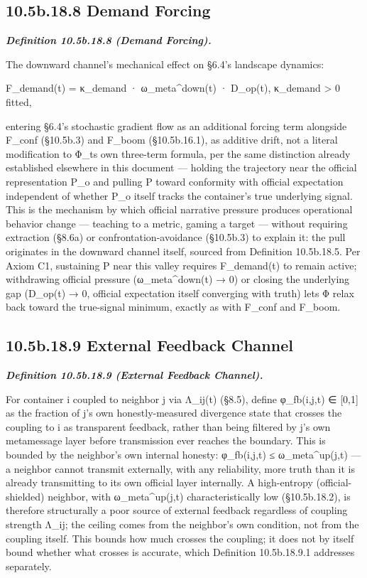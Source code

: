 \documentclass[
]{article}
\begin{document}
\hypertarget{b.18.8-demand-forcing}{%
\subsection{10.5b.18.8 Demand Forcing}\label{b.18.8-demand-forcing}}

\emph{\textbf{Definition 10.5b.18.8 (Demand Forcing).}}

The downward channel's mechanical effect on §6.4's landscape dynamics:

F\_demand(t) = κ\_demand · ω\_meta\^{}down(t) · D\_op(t), κ\_demand
\textgreater{} 0 fitted,

entering §6.4's stochastic gradient flow as an additional forcing term
alongside F\_conf (§10.5b.3) and F\_boom (§10.5b.16.1), as additive
drift, not a literal modification to Φ\_t\textquotesingle s own
three-term formula, per the same distinction already established
elsewhere in this document --- holding the trajectory near the official
representation P\_o and pulling P toward conformity with official
expectation independent of whether P\_o itself tracks the container's
true underlying signal. This is the mechanism by which official
narrative pressure produces operational behavior change --- teaching to
a metric, gaming a target --- without requiring extraction (§8.6a) or
confrontation-avoidance (§10.5b.3) to explain it: the pull originates in
the downward channel itself, sourced from Definition 10.5b.18.5. Per
Axiom C1, sustaining P near this valley requires F\_demand(t) to remain
active; withdrawing official pressure (ω\_meta\^{}down(t) → 0) or
closing the underlying gap (D\_op(t) → 0, official expectation itself
converging with truth) lets Φ relax back toward the true-signal minimum,
exactly as with F\_conf and F\_boom.

\hypertarget{b.18.9-external-feedback-channel}{%
\subsection{10.5b.18.9 External Feedback
Channel}\label{b.18.9-external-feedback-channel}}

\emph{\textbf{Definition 10.5b.18.9 (External Feedback Channel).}}

For container i coupled to neighbor j via Λ\_ij(t) (§8.5), define
φ\_fb(i,j,t) ∈ {[}0,1{]} as the fraction of j's own honestly-measured
divergence state that crosses the coupling to i as transparent feedback,
rather than being filtered by j's own metamessage layer before
transmission ever reaches the boundary. This is bounded by the
neighbor's own internal honesty: φ\_fb(i,j,t) ≤ ω\_meta\^{}up(j,t) --- a
neighbor cannot transmit externally, with any reliability, more truth
than it is already transmitting to its own official layer internally. A
high-entropy (official-shielded) neighbor, with ω\_meta\^{}up(j,t)
characteristically low (§10.5b.18.2), is therefore structurally a poor
source of external feedback regardless of coupling strength Λ\_ij; the
ceiling comes from the neighbor's own condition, not from the coupling
itself. This bounds how much crosses the coupling; it does not by itself
bound whether what crosses is accurate, which Definition 10.5b.18.9.1
addresses separately.
\end{document}
